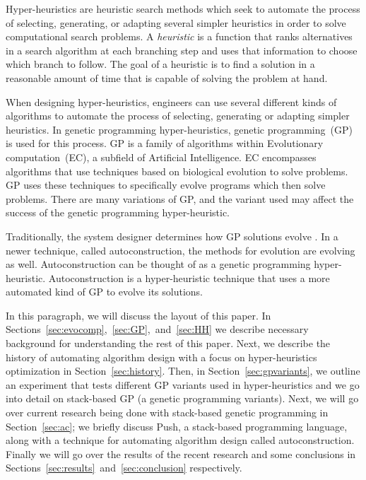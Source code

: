 \documentclass{sig-alternate}
\begin{document}
Hyper-heuristics are heuristic search methods which seek to automate the process of selecting, generating, or adapting several simpler heuristics in order to solve computational search problems. A \textit{heuristic} is a function that ranks alternatives in a search algorithm at each branching step and uses that information to choose which branch to follow. The goal of a heuristic is to find a solution in a reasonable amount of time that is capable of solving the problem at hand.

When designing hyper-heuristics, engineers can use several different kinds of algorithms to automate the process of selecting, generating or adapting simpler heuristics. In genetic programming hyper-heuristics, genetic programming~(GP) is used for this process. GP is a family of algorithms within Evolutionary computation~(EC), a subfield of Artificial Intelligence. EC encompasses algorithms that use techniques based on biological evolution to solve problems. GP uses these techniques to specifically evolve programs which then solve problems. There are many variations of GP, and the variant used may affect the success of the genetic programming hyper-heuristic.

Traditionally, the system designer determines how GP solutions evolve \cite{spector:2016}. In a newer technique, called autoconstruction, the methods for evolution are evolving as well. Autoconstruction can be thought of as a genetic programming hyper-heuristic. Autoconstruction is a hyper-heuristic technique that uses a more automated kind of GP to evolve its solutions.

In this paragraph, we will discuss the layout of this paper. In Sections~\ref{sec:evocomp},~\ref{sec:GP},~and~\ref{sec:HH} we describe necessary background for understanding the rest of this paper. Next, we describe the history of automating algorithm design with a focus on hyper-heuristics optimization in Section~\ref{sec:history}. Then, in Section~\ref{sec:gpvariants}, we outline an experiment that tests different GP variants used in hyper-heuristics and we go into detail on stack-based GP (a genetic programming variants). Next, we will go over current research being done with stack-based genetic programming in Section~\ref{sec:ac}; we briefly discuss Push, a stack-based programming language, along with a technique for automating algorithm design called autoconstruction. Finally we will go over the results of the recent research and some conclusions in Sections~\ref{sec:results}~and~\ref{sec:conclusion} respectively.
\end{document}
